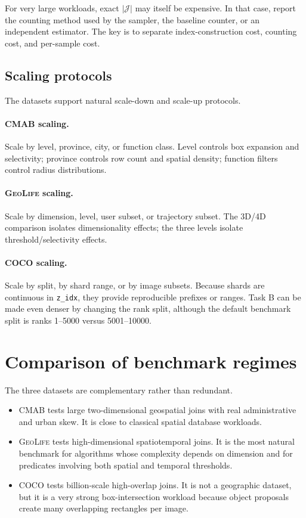 \documentclass[11pt]{article}
\newcommand{\code}[1]{\ifmmode\text{\ttfamily #1}\else\texttt{#1}\fi}
\newcommand{\Jset}{\mathcal J}
\newcommand{\cmab}{\textsc{CMAB}}
\newcommand{\geolife}{\textsc{GeoLife}}
\newcommand{\coco}{\textsc{COCO}}
\begin{document}
For very large workloads, exact $|\Jset|$ may itself be expensive.  In that case, report the counting method used by the sampler, the baseline counter, or an independent estimator.  The key is to separate index-construction cost, counting cost, and per-sample cost.

\subsection{Scaling protocols}

The datasets support natural scale-down and scale-up protocols.

\paragraph{\cmab{} scaling.}
Scale by level, province, city, or function class.  Level controls box expansion and selectivity; province controls row count and spatial density; function filters control radius distributions.

\paragraph{\geolife{} scaling.}
Scale by dimension, level, user subset, or trajectory subset.  The 3D/4D comparison isolates dimensionality effects; the three levels isolate threshold/selectivity effects.

\paragraph{\coco{} scaling.}
Scale by split, by shard range, or by image subsets.  Because shards are continuous in \code{z\_idx}, they provide reproducible prefixes or ranges.  Task B can be made even denser by changing the rank split, although the default benchmark split is ranks 1--5000 versus 5001--10000.

\section{Comparison of benchmark regimes}
\label{sec:comparison}

The three datasets are complementary rather than redundant.

\begin{itemize}[leftmargin=2em,itemsep=2pt]
  \item \cmab{} tests large two-dimensional geospatial joins with real administrative and urban skew.  It is close to classical spatial database workloads.
  \item \geolife{} tests high-dimensional spatiotemporal joins.  It is the most natural benchmark for algorithms whose complexity depends on dimension and for predicates involving both spatial and temporal thresholds.
  \item \coco{} tests billion-scale high-overlap joins.  It is not a geographic dataset, but it is a very strong box-intersection workload because object proposals create many overlapping rectangles per image.
\end{itemize}
\end{document}
